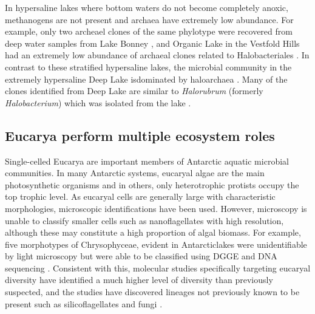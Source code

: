 \documentclass{book}
\begin{document}
In hypersaline lakes where bottom waters do not become completely anoxic, methanogens are not present and archaea have extremely low abundance. 
For example, only two archeael clones of the same phylotype were recovered from deep water samples from Lake Bonney \cite{Glatz2006}, 
and Organic Lake in the Vestfold Hills had an extremely low abundance of archaeal clones related to Halobacteriales \cite{Bowman2000b}. 
In contrast to these stratified hypersaline lakes, the microbial community in the extremely hypersaline Deep Lake isdominated by haloarchaea \cite{Bowman2000b}. 
Many of the clones identified from Deep Lake are similar to \textit{Halorubrum} (formerly \textit{Halobacterium})  which was isolated from the lake \cite{Franzmann1988}. 

\subsection{Eucarya perform multiple ecosystem roles}

Single-celled Eucarya are important members of Antarctic aquatic microbial communities.
In many Antarctic systems, eucaryal algae are the main photosynthetic organisms and in others, only heterotrophic protists occupy the top trophic level. 
As eucaryal cells are generally large with characteristic morphologies, microscopic identifications have been used. 
However, microscopy is unable to classify smaller cells such as nanoflagellates with high resolution, although these may constitute a high proportion of algal biomass.
For example, five morphotypes of Chrysophyceae, evident in Antarcticlakes were unidentifiable by light microscopy but were able to be classified using DGGE and DNA sequencing \cite{Unrein2005}.
Consistent with this, molecular studies specifically targeting eucaryal diversity \cite{Unrein2005, Mosier2007, Bielewicz2011} have identified a much higher level of diversity than previously suspected,
 and the studies have discovered lineages not previously known to be present such as silicoflagellates \cite{Unrein2005} and fungi \cite{Mosier2007, Bielewicz2011}.
\end{document}
